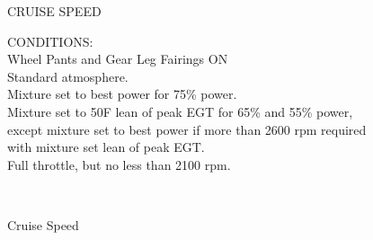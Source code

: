 \begin{figure}[t]
\begin{center}
\begin{perfhdr}CRUISE SPEED\\
\end{perfhdr}

\begin{minipage}{5in}
  \begin{flushleft}
    CONDITIONS:\\
    Wheel Pants and Gear Leg Fairings ON\\
    Standard atmosphere.\\
    Mixture set to best power for 75\% power.\\
    Mixture set to 50\textdegree F lean of peak EGT for 65\% and 55\% power, except mixture set to best power if more than 2600 rpm required with mixture set lean of peak EGT.\\
    Full throttle, but no less than 2100 rpm.\\
    \end{flushleft}
\end{minipage}\\
\vspace{5ex}

\end{center}  %
\caption{Cruise Speed}
\label{Cruise-speed}
\end{figure}


